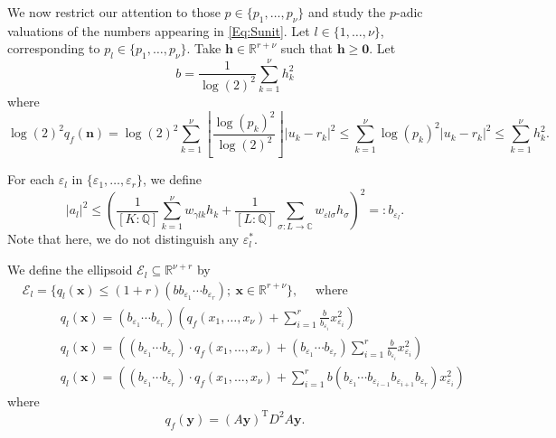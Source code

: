 We now restrict our attention to those $p \in \{p_1, \dots, p_{\nu}\}$ and study the $p$-adic valuations of the numbers appearing in \eqref{Eq:Sunit}. Let $l \in \{1, \dots, \nu\}$, corresponding to $p_l \in \{p_1, \dots, p_{\nu}\}$. Take $\mathbf{h}\in\mathbb{R}^{r+\nu}$ such that $\mathbf{h}\geq \mathbf{0}$. Let
\[b = \frac{1}{\log(2)^2}\sum_{k = 1}^{\nu} h_k^2\]
where
\[\log(2)^2q_f(\mathbf{n}) = \log(2)^2\sum_{k = 1}^{\nu}\left\lfloor\frac{\log(p_k)^2}{\log(2)^2}\right\rfloor|u_k-r_k|^2 \leq \sum_{k = 1}^{\nu} \log(p_k)^2|u_k -r_k|^2 \leq \sum_{k = 1}^{\nu} h_k^2.\]


For each $\varepsilon_l$ in $\{\varepsilon_1, \dots, \varepsilon_r\}$, we define
\[|a_l|^2 \leq \left( \frac{1}{[K:\mathbb{Q}]}\sum_{k = 1}^{\nu} w_{\gamma l k}h_k + \frac{1}{[L:\mathbb{Q}]}\sum_{\sigma:L\to \mathbb{C}} w_{\varepsilon l \sigma}h_{\sigma}\right)^2=:b_{\varepsilon_l}.\]
Note that here, we do not distinguish any $\varepsilon_l^*$. 

We define the ellipsoid $\mathcal{E}_l \subseteq \mathbb{R}^{\nu + r}$ by 
\begin{align}\label{def:ellp}
& \mathcal{E}_l=\{q_l(\mathbf{x})\leq (1 + r)(bb_{\varepsilon_1}\cdots b_{\varepsilon_r}); \ \mathbf{x}\in\mathbb{R}^{r+\nu}\}, \quad \text{ where }\\
&\quad \quad \quad q_l(\mathbf{x})= (b_{\varepsilon_1}\cdots b_{\varepsilon_r})\left( q_f(x_1, \dots, x_{\nu}) + \sum_{i = 1}^r\frac{b}{b_{\varepsilon_i}}x_{\varepsilon_i}^2\right)\\
&\quad \quad \quad q_l(\mathbf{x})=\left((b_{\varepsilon_1}\cdots b_{\varepsilon_r})\cdot q_f(x_1, \dots, x_{\nu}) + (b_{\varepsilon_1}\cdots b_{\varepsilon_r})\sum_{i = 1}^r\frac{b}{b_{\varepsilon_i}}x_{\varepsilon_i}^2\right)\\
&\quad \quad \quad q_l(\mathbf{x})=\left((b_{\varepsilon_1}\cdots b_{\varepsilon_r})\cdot q_f(x_1, \dots, x_{\nu}) + \sum_{i = 1}^rb(b_{\varepsilon_1}\cdots b_{\varepsilon_{i-1}}b_{\varepsilon_{i+1}}b_{\varepsilon_r})x_{\varepsilon_i}^2\right)
\end{align}
where
\[q_f(\mathbf{y}) = (A\mathbf{y})^{\text{T}}D^2A\mathbf{y}.\]

